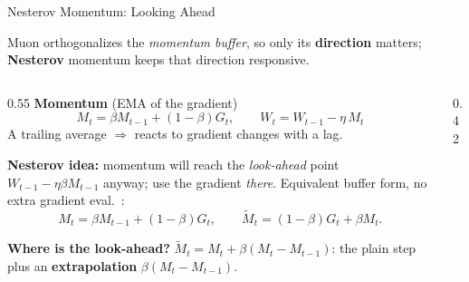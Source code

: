 \begin{frame}{Nesterov Momentum: Looking Ahead}

  Muon orthogonalizes the \emph{momentum buffer}, so only its \textbf{direction} matters; \textbf{Nesterov} momentum keeps that direction responsive.

  \vspace{0.2em}
  \begin{columns}[T]
    \begin{column}{0.55\textwidth}
      \textbf{Momentum} (EMA of the gradient)
      \[
        M_t = \beta M_{t-1} + (1{-}\beta) G_t, \qquad W_t = W_{t-1} - \eta\,M_t
      \]
      A trailing average $\Rightarrow$ reacts to gradient changes with a lag.

      \vspace{0.2em}
      \textbf{Nesterov idea:} momentum will reach the \emph{look-ahead} point $W_{t-1} - \eta\beta M_{t-1}$ anyway; use the gradient \emph{there}. Equivalent buffer form, no extra gradient eval.~\cite{sutskever2013momentum}:
      \[
        M_t = \beta M_{t-1} + (1{-}\beta) G_t, \qquad
        \tilde{M}_t = (1{-}\beta) G_t + \beta M_t.
      \]

      \vspace{0.2em}
      \textbf{Where is the look-ahead?} $\tilde{M}_t = M_t + \beta(M_t - M_{t-1})$: the plain step plus an \textbf{extrapolation} $\beta(M_t{-}M_{t-1})$.
    \end{column}
    \begin{column}{0.42\textwidth}
      \begin{center}
\end{center}
\end{column}
\end{columns}
\end{frame}

